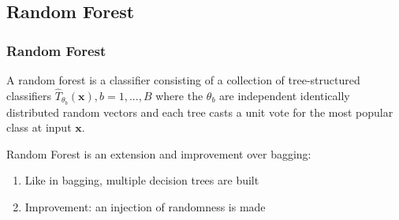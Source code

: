\subsection{Random Forest}

\begin{frame}
\frametitle{Random Forest}


\vspace{1ex}


\begin{definition}[by L.Breiman]
	A random forest is a classifier consisting of a collection of tree-structured classifiers ${\hat{T}_{\theta_{b}}(\textbf{x})}, b = 1,...,B$ where the $\theta_{b}$ are independent identically
	distributed random vectors and each tree casts a unit vote for the most popular class at input $\textbf{x}$.
\end{definition}
\vspace{4ex}

Random Forest is an extension and improvement over bagging:
\vspace{1ex}
\begin{enumerate}
\item Like in bagging, multiple decision trees are built
\vspace{1ex}
\item Improvement: an injection of randomness is made
\end{enumerate}

\end{frame}



